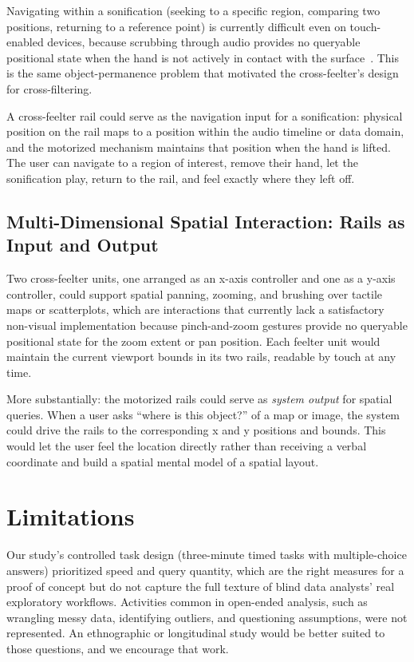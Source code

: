 \documentclass[12pt]{cmuthesis}
\begin{document}
Navigating within a sonification (seeking to a specific region, comparing two positions, returning to a reference point) is currently difficult even on touch-enabled devices, because scrubbing through audio provides no queryable positional state when the hand is not actively in contact with the surface~\cite{Chundury2022Towards, Chundury2024, Chundury2026}. This is the same object-permanence problem that motivated the cross-feelter's design for cross-filtering.

A cross-feelter rail could serve as the navigation input for a sonification: physical position on the rail maps to a position within the audio timeline or data domain, and the motorized mechanism maintains that position when the hand is lifted. The user can navigate to a region of interest, remove their hand, let the sonification play, return to the rail, and feel exactly where they left off.

\subsection{Multi-Dimensional Spatial Interaction: Rails as Input and Output} %

Two cross-feelter units, one arranged as an x-axis controller and one as a y-axis controller, could support spatial panning, zooming, and brushing over tactile maps or scatterplots, which are interactions that currently lack a satisfactory non-visual implementation because pinch-and-zoom gestures provide no queryable positional state for the zoom extent or pan position. Each feelter unit would maintain the current viewport bounds in its two rails, readable by touch at any time.

More substantially: the motorized rails could serve as \textit{system output} for spatial queries. When a user asks ``where is this object?'' of a map or image, the system could drive the rails to the corresponding x and y positions and bounds. This would let the user feel the location directly rather than receiving a verbal coordinate and build a spatial mental model of a spatial layout.

\section{Limitations}
\label{sec:limitations} 

Our study's controlled task design (three-minute timed tasks with multiple-choice answers) prioritized speed and query quantity, which are the right measures for a proof of concept but do not capture the full texture of blind data analysts' real exploratory workflows. Activities common in open-ended analysis, such as wrangling messy data, identifying outliers, and questioning assumptions, were not represented. An ethnographic or longitudinal study would be better suited to those questions, and we encourage that work. 
\end{document}

